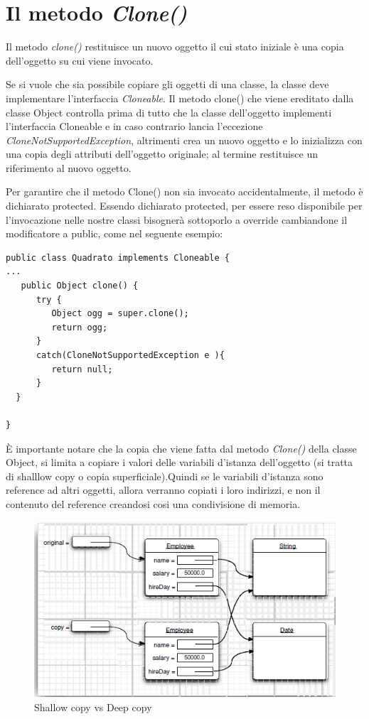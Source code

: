 \section{Il metodo \textit{Clone()}}
Il metodo \textit{clone()} restituisce un nuovo oggetto il cui stato iniziale è una copia dell’oggetto su cui viene invocato.

Se si vuole che sia possibile copiare gli oggetti di una classe, la classe deve implementare l’interfaccia \textit{Cloneable}.
Il metodo clone() che viene ereditato dalla classe Object controlla prima di tutto che la classe dell’oggetto implementi l’interfaccia Cloneable e in caso contrario lancia l’eccezione \textit{CloneNotSupportedException}, altrimenti crea un nuovo oggetto e lo inizializza con una copia degli attributi dell’oggetto originale; al termine restituisce un riferimento al nuovo oggetto.

Per garantire che il metodo Clone() non sia invocato accidentalmente, il metodo è dichiarato protected. Essendo dichiarato protected, per essere reso disponibile per l'invocazione nelle nostre classi bisognerà sottoporlo a override cambiandone il modificatore a public, come nel seguente esempio:

\begin{lstlisting}
public class Quadrato implements Cloneable {
...
   public Object clone() {
      try {
         Object ogg = super.clone();
         return ogg;    
      }    
      catch(CloneNotSupportedException e ){
         return null;
      }
  }    
       
}
\end{lstlisting}
È importante notare che la copia che viene fatta dal metodo \textit{Clone()} della classe Object, si limita a copiare i valori delle variabili d'istanza dell'oggetto (si tratta di shalllow copy o copia superficiale).Quindi se le variabili d'istanza sono reference ad altri oggetti, allora verranno copiati i loro indirizzi, e non il contenuto del reference creandosi cosi una condivisione di memoria.
\begin{figure}[H]
\centering
\includegraphics[scale=0.8]{images/shallow}
\caption{Shallow copy vs Deep copy\label{fig:UC3}}
\end{figure}

